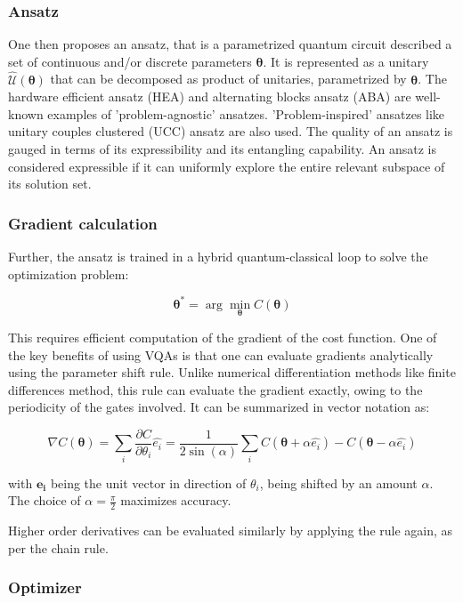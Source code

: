 \documentclass[11pt,a4paper]{article}
\begin{document}
\subsubsection{Ansatz} \label{sec:Ansatz}

One then proposes an ansatz, that is a parametrized quantum circuit described a set of continuous and/or discrete parameters $\boldsymbol{\theta}$. It is represented as a unitary $\mathcal{\hat{U}}(\boldsymbol{\theta})$ that can be decomposed as product of unitaries, parametrized by $\boldsymbol{\theta}$. The hardware efficient ansatz (HEA) and alternating blocks ansatz (ABA) are well-known examples of 'problem-agnostic' ansatzes. 'Problem-inspired' ansatzes like unitary couples clustered (UCC) ansatz are also used. The quality of an ansatz is gauged in terms of its expressibility and its entangling capability. An ansatz is considered expressible if it can uniformly explore the entire relevant subspace of its solution set.

\subsubsection{Gradient calculation}

Further, the ansatz is trained in a hybrid quantum-classical loop to solve the optimization problem:

$$\boldsymbol{\theta}^* = \arg\min_{\boldsymbol{\theta}} C(\boldsymbol{\theta})$$

This requires efficient computation of the gradient of the cost function. One of the key benefits of using VQAs is that one can evaluate gradients analytically using the parameter shift rule. Unlike numerical differentiation methods like finite differences method, this rule can evaluate the gradient exactly, owing to the periodicity of the gates involved. It can be summarized in vector notation as:

$$
  \nabla C(\boldsymbol{\theta}) = \sum_{i} \frac{\partial C}{\partial \theta_i} \hat{e_i} = \frac{1}{2 \sin(\alpha)} \sum_{i} C(\boldsymbol{\theta} + \alpha \hat{e_i}) - C(\boldsymbol{\theta} - \alpha \hat{e_i})
$$

with $\boldsymbol{e_i}$ being the unit vector in direction of $\theta_i$, being shifted by an amount $\alpha$. The choice of $\alpha = \frac{\pi}{2}$ maximizes accuracy.

Higher order derivatives can be evaluated similarly by applying the rule again, as per the chain rule.

\subsubsection{Optimizer}
\end{document}
